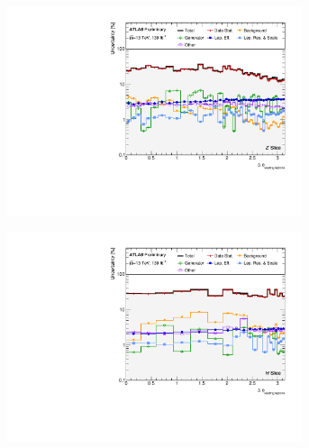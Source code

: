 \begin{figure}[hp]
    \centering
    \begin{subfigure}{.49\textwidth}\centering\includegraphics[width = 0.95\textwidth]{Figures/m4l/Systematics/Unfolded/UnfoldedSys_dPhiLeadLep_vs_M4l_Stack_Paper0.pdf}\end{subfigure}
    \begin{subfigure}{.49\textwidth}\centering\includegraphics[width = 0.95\textwidth]{Figures/m4l/Systematics/Unfolded/UnfoldedSys_dPhiLeadLep_vs_M4l_Stack_Paper1.pdf}\end{subfigure}

\end{figure}
